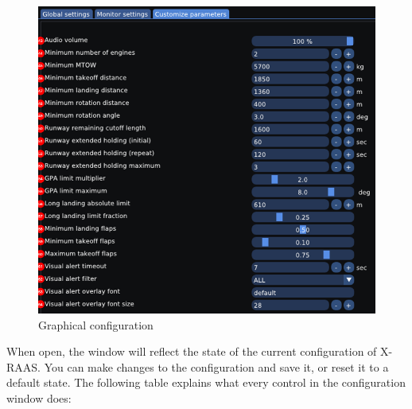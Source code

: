 \documentclass[a4paper,12pt]{article}
\begin{document}
\begin{figure}[H]
\vspace{.5em}
\begin{center}
\includegraphics[width=\textwidth]{../src/config_window_3.png}
\end{center}
\caption{Graphical configuration}
\label{GUIConfigurationWindow3}
\end{figure}

\noindent When open, the window will reflect the state of the current
configuration of X-RAAS. You can make changes to the configuration and
save it, or reset it to a default state. The following table explains
what every control in the configuration window does:

\newcommand{\guiconfbtn}[1]{#1\label{gui_conf_btn_label_#1}}
\end{document}
